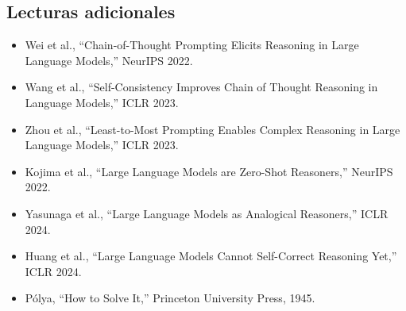 \subsection{Lecturas adicionales}

\begin{itemize}
    \item Wei et al., ``Chain-of-Thought Prompting Elicits Reasoning in Large Language Models,'' NeurIPS 2022.
    \item Wang et al., ``Self-Consistency Improves Chain of Thought Reasoning in Language Models,'' ICLR 2023.
    \item Zhou et al., ``Least-to-Most Prompting Enables Complex Reasoning in Large Language Models,'' ICLR 2023.
    \item Kojima et al., ``Large Language Models are Zero-Shot Reasoners,'' NeurIPS 2022.
    \item Yasunaga et al., ``Large Language Models as Analogical Reasoners,'' ICLR 2024.
    \item Huang et al., ``Large Language Models Cannot Self-Correct Reasoning Yet,'' ICLR 2024.
    \item P\'{o}lya, ``How to Solve It,'' Princeton University Press, 1945.
\end{itemize}



